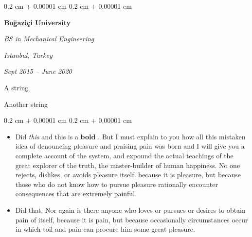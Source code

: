 \documentclass[10pt, letterpaper]{article}
\newenvironment{summary}{
    \begin{description}[
        topsep=0.10 cm,
        parsep=0.10 cm,
        partopsep=0pt,
        itemsep=0pt,
        leftmargin=0.4 cm + 10pt
    ]
}{
    \end{description}
} %
\newenvironment{highlights}{
    \begin{itemize}[
        topsep=0.10 cm,
        parsep=0.10 cm,
        partopsep=0pt,
        itemsep=0pt,
        leftmargin=0.4 cm + 10pt
    ]
}{
    \end{itemize}
} %
\newenvironment{onecolentry}{
    \begin{adjustwidth}{
        0.2 cm + 0.00001 cm
    }{
        0.2 cm + 0.00001 cm
    }
}{
    \end{adjustwidth}
} %
\newenvironment{twocolentry}[2][]{
    \onecolentry
    \def\secondColumn{#2}
    \setcolumnwidth{\fill, 4.5 cm}
    \begin{paracol}{2}
}{
    \switchcolumn \raggedleft \secondColumn
    \end{paracol}
    \endonecolentry
} %
\let\hrefWithoutArrow\href
\renewcommand{\href}[2]{\hrefWithoutArrow{#1}{\ifthenelse{\equal{#2}{}}{ }{#2 }\raisebox{.15ex}{\footnotesize \faExternalLink*}}}
\begin{document}
        \begin{twocolentry}{
        \textit{Istanbul, Turkey}    
            
        \textit{Sept 2015 – June 2020}}
            \textbf{Boğaziçi University}

            \textit{BS in Mechanical Engineering}
        \end{twocolentry}
            \begin{summary}
                \item A string
                \item Another string
            \end{summary}
        \vspace{0.10 cm}
        \begin{onecolentry}
            \begin{highlights}
                \item Did \textit{this} and this is a \textbf{bold} \href{https://example.com}{link}. But I must explain to you how all this mistaken idea of denouncing pleasure and praising pain was born and I will give you a complete account of the system, and expound the actual teachings of the great explorer of the truth, the master-builder of human happiness. No one rejects, dislikes, or avoids pleasure itself, because it is pleasure, but because those who do not know how to pursue pleasure rationally encounter consequences that are extremely painful.
                \item Did that. Nor again is there anyone who loves or pursues or desires to obtain pain of itself, because it is pain, but because occasionally circumstances occur in which toil and pain can procure him some great pleasure.
            \end{highlights}
        \end{onecolentry}


        \vspace{0.2 cm}
\end{document}
